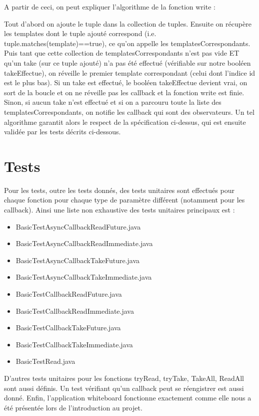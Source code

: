 \documentclass{report}
\begin{document}
A partir de ceci, on peut expliquer l'algorithme de la fonction write :

Tout d'abord on ajoute le tuple dans la collection de tuples. Ensuite on récupère les templates dont le tuple ajouté correspond (i.e. tuple.matches(template)==true), ce qu'on appelle
les templatesCorrespondants. Puis tant que cette collection de templatesCorrespondants n'est pas vide ET qu'un take (sur ce tuple ajouté) n'a pas
été effectué (vérifiable sur notre booléen takeEffectue), on réveille le premier template correspondant (celui dont l'indice id est le plus bas).
Si un take est effectué, le booléen takeEffectue devient vrai, on sort de la boucle et on ne réveille pas les callback et la fonction write est finie.
Sinon, si aucun take n'est effectué et si on a parcouru toute la liste des templatesCorrespondants, on notifie les callback qui sont des observateurs.
Un tel algorithme garantit alors le respect de la spécification ci-dessus, qui est ensuite validée par les tests décrits ci-dessous.

\section{Tests}

Pour les tests, outre les tests donnés, des tests unitaires sont effectués pour chaque fonction pour chaque type de paramètre différent (notamment pour les callback). Ainsi une liste non exhaustive des tests unitaires principaux est :
\begin{itemize}
\item BasicTestAsyncCallbackReadFuture.java
\item BasicTestAsyncCallbackReadImmediate.java
\item BasicTestAsyncCallbackTakeFuture.java
\item BasicTestAsyncCallbackTakeImmediate.java
\item BasicTestCallbackReadFuture.java
\item BasicTestCallbackReadImmediate.java
\item BasicTestCallbackTakeFuture.java
\item BasicTestCallbackTakeImmediate.java
\item BasicTestRead.java
\end{itemize}
D'autres tests unitaires pour les fonctions tryRead, tryTake, TakeAll, ReadAll sont aussi définis. Un test vérifiant qu'un callback peut se réengistrer est aussi donné. Enfin, l'application whiteboard fonctionne
exactement comme elle nous a été présentée lors de l'introduction au projet.
\end{document}
